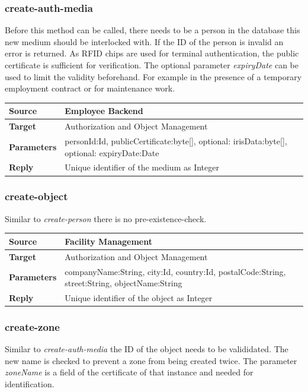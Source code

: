 \documentclass[12pt,a4paper,titlepage,oneside]{scrartcl}
\begin{document}
\subsubsection{create-auth-media}

Before this method can be called, there needs to be a person in the database this new medium should be interlocked with. If the ID of the person is invalid an error is returned. As RFID chips are used for terminal authentication, the public certificate is sufficient for verification. The optional parameter \emph{expiryDate} can be used to limit the validity beforehand. For example in the presence of a temporary employment contract or for maintenance work.

\begin{table}[h]
    \centering
    \begin{tabular}{|l|p{12cm}|} \hline
    \textbf{Source}&Employee Backend\\ \hline
    \textbf{Target}&Authorization and Object Management\\ \hline
    \textbf{Parameters}&personId:Id, publicCertificate:byte[], optional: irisData:byte[], optional: expiryDate:Date\\ \hline
    \textbf{Reply}&Unique identifier of the medium as Integer\\ \hline
    \end{tabular}
\end{table}

\subsubsection{create-object}
Similar to \emph{create-person} there is no pre-existence-check.

\begin{table}[h]
    \centering
    \begin{tabular}{|l|p{12cm}|} \hline
    \textbf{Source}&Facility Management\\ \hline
    \textbf{Target}&Authorization and Object Management\\ \hline
    \textbf{Parameters}&companyName:String, city:Id, country:Id, postalCode:String, street:String, objectName:String\\ \hline
    \textbf{Reply}&Unique identifier of the object as Integer\\ \hline
    \end{tabular}
\end{table}

\subsubsection{create-zone}
Similar to \emph{create-auth-media} the ID of the object needs to be valididated. The new name is checked to prevent a zone from being created twice. The parameter \emph{zoneName} is a field of the certificate of that instance and needed for identification.
\end{document}
